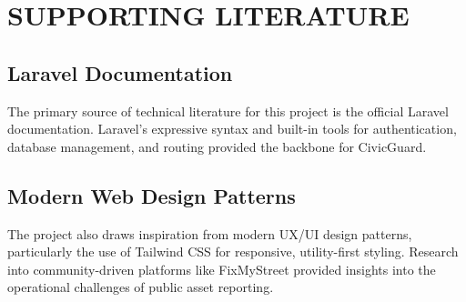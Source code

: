 \chapter{SUPPORTING LITERATURE}

\section{Laravel Documentation}
The primary source of technical literature for this project is the official Laravel documentation. Laravel's expressive syntax and built-in tools for authentication, database management, and routing provided the backbone for CivicGuard.

\section{Modern Web Design Patterns}
The project also draws inspiration from modern UX/UI design patterns, particularly the use of Tailwind CSS for responsive, utility-first styling. Research into community-driven platforms like FixMyStreet provided insights into the operational challenges of public asset reporting.
